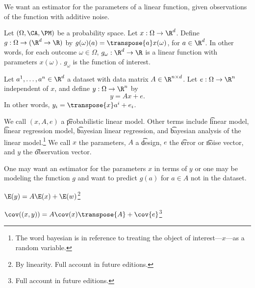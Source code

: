 

We want an estimator for the parameters of a linear function, given observations of the function with additive noise.


Let $(\Omega, \CA, \PM)$ be a probability space.
Let $x: \Omega \to \R^d$.
Define $g: \Omega \to (\R^d \to \R)$ by $g(\omega)(a) = \transpose{a}x(\omega)$, for $a \in \R^d$.
In other words, for each outcome $\omega \in \Omega$, $g_\omega: \R^d \to \R$ is a linear function with parameters $x(\omega)$.
$g_\omega$ is the function of interest.


Let $a^1, \dots, a^n \in \R^d$ a dataset with data matrix $A \in \R^{n \times d}$.
Let $e: \Omega \to \R^n$ independent of $x$, and define $y: \Omega \to \R^n$ by
\[
  y = Ax + e.
\]
In other words, $y_i = \transpose{x}a^i + e_i$.

We call $(x, A, e)$ a \t{probabilistic linear model}.
Other terms include \t{linear model}, \t{linear regression model}, \t{bayesian linear regression}, and \t{bayesian analysis of the linear model}.\footnote{The word bayesian is in reference to treating the object of interest---$x$---as a random variable.}
We call $x$ the parameters, $A$ a \t{design}, $e$ the \t{error} or \t{noise} vector, and $y$ the \t{observation} vector.

One may want an estimator for the parameters $x$ in terms of $y$ or one may be modeling the function $g$ and want to predict $g(a)$ for $a \in A$ not in the dataset.


\begin{proposition}
  $\E(y) = A\E(x) + \E(w)$\footnote{By linearity. Full account in future editions.}
\end{proposition}

\begin{proposition}
  $\cov((x, y)) = A\cov(x)\transpose{A} + \cov{e}$\footnote{Full account in future editions.}
\end{proposition}
